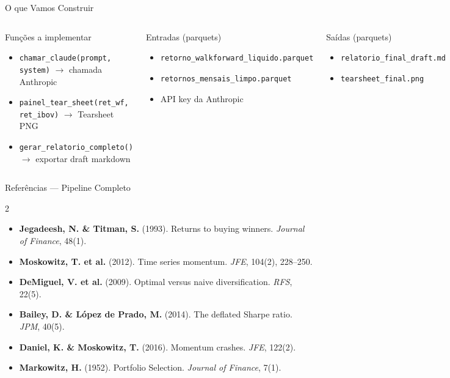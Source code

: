 \documentclass[aspectratio=169,12pt]{beamer}
\begin{document}
\begin{frame}[fragile]{O que Vamos Construir}
\begin{columns}[T]
\begin{block}{Funções a implementar}
\begin{itemize}
  \item \texttt{chamar\_claude(prompt, system)} $\to$ chamada Anthropic
  \item \texttt{painel\_tear\_sheet(ret\_wf, ret\_ibov)} $\to$ Tearsheet PNG
  \item \texttt{gerar\_relatorio\_completo()} $\to$ exportar draft markdown
\end{itemize}
\end{block}
\begin{block}{Entradas (parquets)}
\begin{itemize}
  \item \texttt{retorno\_walkforward\_liquido.parquet}
  \item \texttt{retornos\_mensais\_limpo.parquet}
  \item API key da Anthropic
\end{itemize}
\end{block}
\vspace{.4em}
\begin{exampleblock}{Saídas (parquets)}
\begin{itemize}
  \item \texttt{relatorio\_final\_draft.md}
  \item \texttt{tearsheet\_final.png}
\end{itemize}
\end{exampleblock}
\end{columns}
\end{frame}

\begin{frame}[fragile]{Referências — Pipeline Completo}
\begin{multicols}{2}
\tiny
\begin{itemize}
  \item \textbf{Jegadeesh, N. \& Titman, S.} (1993). Returns to buying winners. \textit{Journal of Finance}, 48(1).
  \item \textbf{Moskowitz, T. et al.} (2012). Time series momentum. \textit{JFE}, 104(2), 228--250.
  \item \textbf{DeMiguel, V. et al.} (2009). Optimal versus naive diversification. \textit{RFS}, 22(5).
  \item \textbf{Bailey, D. \& López de Prado, M.} (2014). The deflated Sharpe ratio. \textit{JPM}, 40(5).
  \item \textbf{Daniel, K. \& Moskowitz, T.} (2016). Momentum crashes. \textit{JFE}, 122(2).
  \item \textbf{Markowitz, H.} (1952). Portfolio Selection. \textit{Journal of Finance}, 7(1).
\end{itemize}
\end{multicols}
\end{frame}
\end{document}
